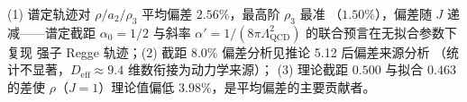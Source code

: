 \begin{remark}[解读]
(1) 谱定轨迹对 $\rho/a_2/\rho_3$ 平均偏差 $2.56\%$，最高阶 $\rho_3$ 最准
（$1.50\%$），偏差随 $J$ 递减——谱定截距 $\alpha_0 = 1/2$ 与斜率
$\alpha' = 1/(8\pi\Lambda_{\mathrm{QCD}}^2)$ 的联合预言在无拟合参数下复现
强子 Regge 轨迹；(2) 截距 $8.0\%$ 偏差分析见推论 5.12 后偏差来源分析
（统计不显著，$D_{\mathrm{eff}} \approx 9.4$ 维数衔接为动力学来源）；
(3) 理论截距 $0.500$ 与拟合 $0.463$ 的差使 $\rho$（$J=1$）理论值偏低
$3.98\%$，是平均偏差的主要贡献者。
\end{remark}
